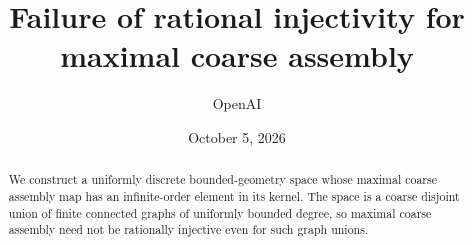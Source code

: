 \documentclass[11pt]{article}
\title{Failure of rational injectivity for maximal coarse assembly}
\author{OpenAI}
\date{October 5, 2026}
\begin{document}
\maketitle
\begin{abstract}
We construct a uniformly discrete bounded-geometry space whose maximal coarse
assembly map has an infinite-order element in its kernel. The space is a coarse
disjoint union of finite connected graphs of uniformly bounded degree, so
maximal coarse assembly need not be rationally injective even for such graph
unions.
\end{abstract}







\end{document}
